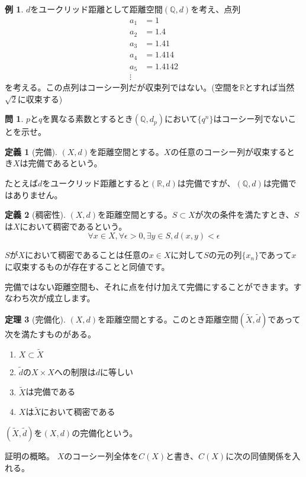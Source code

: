 \documentclass[uplatex]{jsarticle}
\newcommand{\Q}{\mathbb{Q}}
\newcommand{\R}{\mathbb{R}}
\theoremstyle{definition} %
\newtheorem{thm}{定理}
\newtheorem{defi}[thm]{定義}
\newtheorem*{example*}{例}
\newtheorem*{exercise*}{問}
\begin{document}
\begin{example*}
$d$をユークリッド距離として距離空間$(\Q, d)$を考え、点列
\begin{align*}
a_1 &= 1 \\
a_2 &= 1.4 \\
a_3 &= 1.41 \\
a_4 &= 1.414 \\
a_5 &= 1.4142 \\
\vdots
\end{align*}
を考える。この点列はコーシー列だが収束列ではない。(空間を$\R$とすれば当然$\sqrt 2$に収束する)
\end{example*}

\begin{exercise*}
$p$と$q$を異なる素数とするとき$(\Q, d_p)$において$\{q^n\}$はコーシー列でないことを示せ。
\end{exercise*}

\begin{oframed}\begin{defi}[完備]
$(X, d)$を距離空間とする。$X$の任意のコーシー列が収束するとき$X$は完備であるという。
\end{defi}\end{oframed}

たとえば$d$をユークリッド距離とすると$(\R, d)$は完備ですが、$(\Q, d)$は完備ではありません。

\begin{oframed}\begin{defi}[稠密性]
$(X, d)$を距離空間とする。$S \subset X$が次の条件を満たすとき、$S$は$X$において稠密であるという。
\[
\forall x \in X, \forall \epsilon > 0, \exists y \in S, d(x, y) < \epsilon
\]
\end{defi}\end{oframed}

$S$が$X$において稠密であることは任意の$x\in X$に対して$S$の元の列$\{x_n\}$であって$x$に収束するものが存在することと同値です。

完備ではない距離空間も、それに点を付け加えて完備にすることができます。すなわち次が成立します。

\begin{oframed}\begin{thm}[完備化]
$(X, d)$を距離空間とする。このとき距離空間$(\tilde{X}, \tilde{d})$であって次を満たすものがある。
\begin{enumerate}
\item $X \subset \tilde{X}$
\item $\tilde{d}$の$X \times X$への制限は$d$に等しい
\item $\tilde{X}$は完備である
\item $X$は$\tilde{X}$において稠密である
\end{enumerate}
$(\tilde{X}, \tilde{d})$を$(X,d)$の完備化という。
\end{thm}\end{oframed}
\noindent 証明の概略。
$X$のコーシー列全体を$C(X)$と書き、$C(X)$に次の同値関係を入れる。
\end{document}
